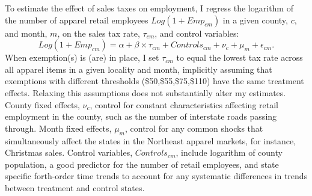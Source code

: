 \documentclass[12pt]{article}
\begin{document}
	
	
	To estimate the effect of sales taxes on employment, I regress the logarithm of the number of apparel retail employees $Log(1+Emp_{cm})$ in a given county, $c$, and month, $m$, on the sales tax rate, $\tau_{cm}$, and control variables:
	\begin{equation}
	\label{reg:dd}
	Log(1+Emp_{cm}) = \alpha+\beta\times\tau_{cm}+Controls_{cm}+\nu_{c}+\mu_{m}+\epsilon_{cm}.
	\end{equation} 
	When exemption(s) is (are) in place, I set $\tau_{cm}$ to equal the lowest tax rate across all apparel items in a given locality and month, implicitly assuming that exemptions with different thresholds (\$50,\$55,\$75,\$110) have the same treatment effects. Relaxing this assumptions does not substantially alter my estimates.	
	County fixed effects, $\nu_{c}$,  control for constant characteristics affecting retail employment in the county, such as the number of interstate roads passing through. Month fixed effects, $\mu_{m}$, control for any common shocks that simultaneously affect the states in the Northeast apparel markets, for instance, Christmas sales. Control variables, $Controls_{cm}$, include logarithm of county population, a good predictor for the number of retail employees, and state specific forth-order time trends to account for any systematic differences in trends between treatment and control states. 
	
\end{document}

